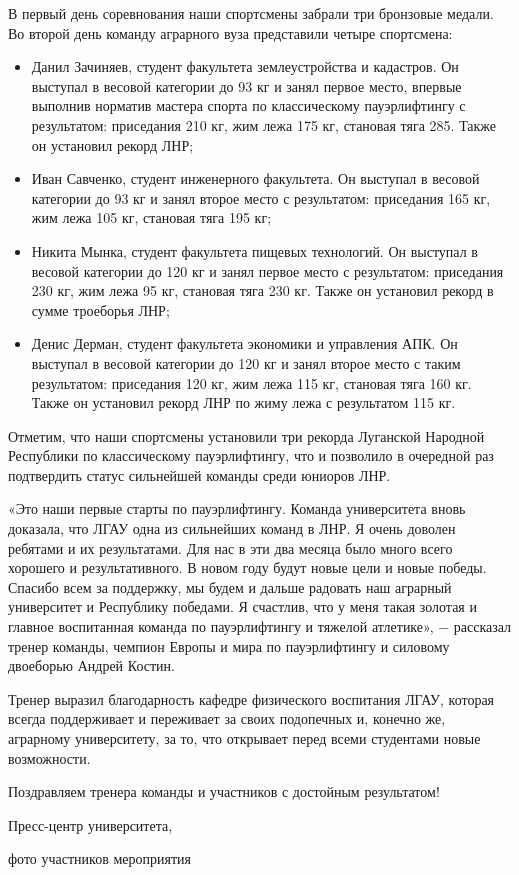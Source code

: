 В первый день соревнования наши спортсмены забрали три бронзовые медали. Во
второй день команду аграрного вуза представили четыре спортсмена:

\begin{itemize} %
		\item Данил Зачиняев, студент факультета землеустройства и кадастров. Он выступал
		в весовой категории до 93 кг и занял первое место, впервые выполнив
		норматив мастера спорта по классическому пауэрлифтингу с результатом:
		приседания 210 кг, жим лежа 175 кг, становая тяга 285. Также он установил
		рекорд ЛНР;

		\item Иван Савченко, студент инженерного факультета. Он выступал в весовой
		категории до 93 кг и занял второе место с результатом: приседания 165 кг,
		жим лежа 105 кг, становая тяга 195 кг;

		\item Никита Мынка, студент факультета пищевых технологий. Он выступал в весовой
		категории до 120 кг и занял первое место с результатом: приседания 230 кг,
		жим лежа 95 кг, становая тяга 230 кг. Также он установил рекорд в сумме
		троеборья ЛНР;

		\item Денис Дерман, студент факультета экономики и управления АПК. Он выступал в
		весовой категории до 120 кг и занял второе место с таким результатом:
		приседания 120 кг, жим лежа 115 кг, становая тяга 160 кг. Также он
		установил рекорд ЛНР по жиму лежа с результатом 115 кг.
\end{itemize} %

Отметим, что наши спортсмены установили три рекорда Луганской Народной
Республики по классическому пауэрлифтингу, что и позволило в очередной раз
подтвердить статус сильнейшей команды среди юниоров ЛНР.


\begin{zznagolos}
«Это наши первые старты по пауэрлифтингу. Команда университета вновь
доказала, что ЛГАУ одна из сильнейших команд в ЛНР. Я очень доволен ребятами и
их результатами. Для нас в эти два месяца было много всего хорошего и
результативного. В новом году будут новые цели и новые победы. Спасибо всем за
поддержку, мы будем и дальше радовать наш аграрный университет и Республику
победами. Я счастлив, что у меня такая золотая и главное воспитанная команда по
пауэрлифтингу и тяжелой атлетике», − рассказал тренер команды, чемпион Европы и
мира по пауэрлифтингу и силовому двоеборью Андрей Костин. 	
\end{zznagolos}


Тренер выразил благодарность кафедре физического воспитания ЛГАУ, которая
всегда поддерживает и переживает за своих подопечных и, конечно же, аграрному
университету, за то, что открывает перед всеми студентами новые возможности.

Поздравляем тренера команды и участников с достойным результатом!

Пресс-центр университета,

фото участников мероприятия
